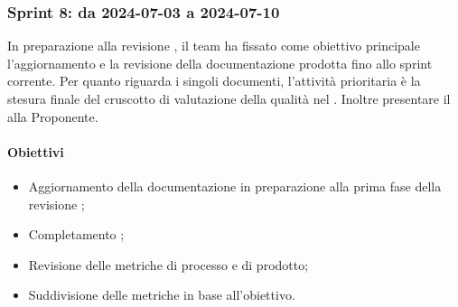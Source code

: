 \subsubsection{Sprint 8: da 2024-07-03 a 2024-07-10}
\par In preparazione alla revisione , il team ha fissato come obiettivo principale l’aggiornamento e la revisione della documentazione prodotta fino allo sprint corrente. Per quanto riguarda i singoli documenti, l’attività prioritaria è la stesura finale del cruscotto di valutazione della qualità nel \PdQ. Inoltre presentare il  alla Proponente.

\paragraph{Obiettivi}
\begin{itemize}
  \item Aggiornamento della documentazione in preparazione alla prima fase della revisione ;
  \item Completamento ;
  \item Revisione delle metriche di processo e di prodotto;
  \item Suddivisione delle metriche in base all'obiettivo.
\end{itemize}

\vspace{0.5\baselineskip}
\par [Inserire Gantt]
